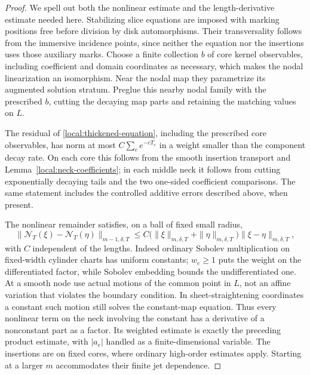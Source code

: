 \documentclass[11pt]{article}
\theoremstyle{definition}
\theoremstyle{remark}
\numberwithin{equation}{section}
\begin{document}
\begin{proof}
We spell out both the nonlinear estimate and the length-derivative
estimate needed here.  Stabilizing slice equations are imposed with
marking positions free before division by disk automorphisms.  Their
transversality follows from the immersive incidence points, since
neither the equation nor the insertions uses those auxiliary marks.
Choose a finite collection $b$ of core kernel observables, including
coefficient and domain coordinates as necessary, which makes the
nodal linearization an isomorphism.  Near the nodal map they
parametrize its augmented solution stratum.  Preglue this nearby
nodal family with the prescribed $b$, cutting the decaying map parts
and retaining the matching values on $L$.

The residual of \eqref{local:thickened-equation}, including the
prescribed core observables, has norm at most
$C\sum_e e^{-cT_e}$ in a weight smaller than the component decay
rate.  On each core this follows from the smooth insertion transport
and Lemma~\ref{local:neck-coefficients}; in each middle neck it follows
from cutting exponentially decaying tails and the two one-sided
coefficient comparisons.  The same statement includes the controlled
additive errors described above, when present.

The nonlinear remainder satisfies, on a ball of fixed small radius,
\begin{equation}\label{local:quadratic}
 \|\mathcal N_T(\xi)-\mathcal N_T(\eta)\|_{m-1,\delta,T}
 \leq C\bigl(\|\xi\|_{m,\delta,T}+\|\eta\|_{m,\delta,T}\bigr)
                \|\xi-\eta\|_{m,\delta,T},
\end{equation}
with $C$ independent of the lengths.  Indeed ordinary Sobolev
multiplication on fixed-width cylinder charts has uniform constants;
$w_e\geq1$ puts the weight on the differentiated factor, while
Sobolev embedding bounds the undifferentiated one.  At a smooth
node use actual motions of the common point in $L$, not an affine
variation that violates the boundary condition.  In sheet-straightening
coordinates a constant such motion still solves the constant-map
equation.  Thus every nonlinear term on the neck involving the
constant has a derivative of a nonconstant part as a factor.  Its
weighted estimate is exactly the preceding product estimate, with
$|a_e|$ handled as a finite-dimensional variable.  The insertions
are on fixed cores, where ordinary high-order estimates apply.
Starting at a larger $m$ accommodates their finite jet dependence.


\end{proof}
\end{document}
